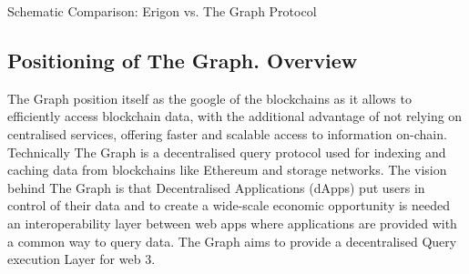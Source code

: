 \documentclass[11pt,a4paper,titlepage]{scrartcl}
\begin{document}
\begin{table}[H] %
\centering
\caption{Schematic Comparison: Erigon vs. The Graph Protocol}
\captionsetup{font=footnotesize, justification=centering}
\caption*{\footnotesize This table compares Erigon and The Graph Protocol in terms of focus, usability, infrastructure, and support for decentralized applications.}
\label{tab:erigon_vs_graph}
\end{table}


\subsection{Positioning of The Graph. Overview}

The Graph position itself as the google of the blockchains as it allows to efficiently access blockchain data, with the additional advantage of not  relying on centralised services, offering faster and scalable access to information on-chain. Technically The Graph is a decentralised query protocol used for indexing and caching data from blockchains like Ethereum and storage networks. The vision behind The Graph is that Decentralised Applications (dApps) put users in control of their data and to create a wide-scale economic opportunity is needed an interoperability layer between web apps where applications are provided with a common way to query data. The Graph aims to provide a decentralised Query execution Layer for web 3. 
\end{document}
